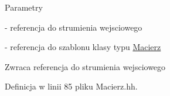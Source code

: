 \begin{DoxyParams}{Parametry}
\item[\mbox{\tt[in,out]} {\em \&Strm}]-\/ referencja do strumienia wejsciowego \item[\mbox{\tt[in,out]} {\em \&Mac}]-\/ referencja do szablonu klasy typu \hyperlink{class_macierz}{Macierz} \end{DoxyParams}
\begin{DoxyReturn}{Zwraca}
referencja do strumienia wejsciowego 
\end{DoxyReturn}


Definicja w linii 85 pliku Macierz.hh.

